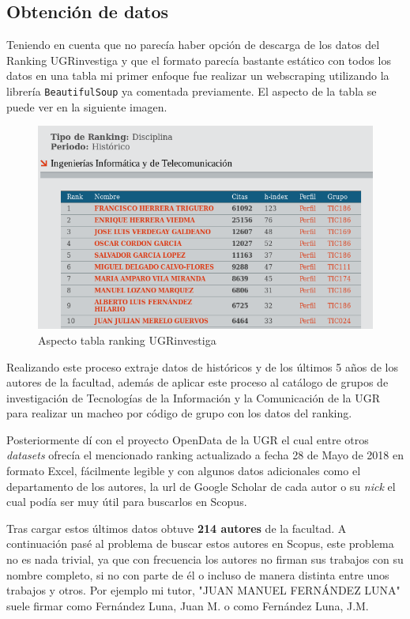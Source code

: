 \subsection{Obtención de datos}

Teniendo en cuenta que no parecía haber opción de descarga de los datos del Ranking UGRinvestiga y que el formato parecía bastante estático con todos los datos en una tabla mi primer enfoque fue realizar un \gls{webscraping} utilizando la librería \texttt{BeautifulSoup} ya comentada previamente. El aspecto de la tabla se puede ver en la siguiente imagen.


\begin{figure}[h!]
	
	\centering
	\includegraphics[width=0.9\linewidth]{imagenes/aspectoRankingUGRi}
	\caption{Aspecto tabla ranking UGRinvestiga}
\end{figure}

Realizando este proceso extraje datos de históricos y de los últimos 5 años de los autores de la facultad, además de aplicar este proceso al catálogo de grupos de investigación de Tecnologías de la Información y la Comunicación de la  \acrshort{UGR} para realizar un macheo por código de grupo con los datos del ranking.

Posteriormente dí con el proyecto OpenData de la \acrlong{UGR} el cual entre otros \textit{datasets} ofrecía el mencionado ranking actualizado a fecha 28 de Mayo de 2018 \cite{opendataUGR} en formato Excel, fácilmente legible y con algunos datos adicionales como el departamento de los autores, la url de Google Scholar de cada autor o su \textit{nick} el cual podía ser muy útil para buscarlos en Scopus.

Tras cargar estos últimos datos obtuve \textbf{214 autores} de la facultad. A continuación pasé al problema de buscar estos autores en Scopus, este problema no es nada trivial, ya que con frecuencia los autores no firman sus trabajos con su nombre completo, si no con parte de él o incluso de manera distinta entre unos trabajos y otros. Por ejemplo mi tutor, "JUAN MANUEL FERNÁNDEZ LUNA" suele firmar como Fernández Luna, Juan M. o como Fernández Luna, J.M.

